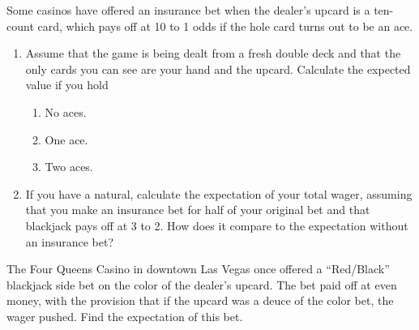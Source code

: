 \documentclass[12pt,letterpaper]{hmcpset}
\begin{document}
\begin{problem}[Bollman 6.2]
  Some casinos have offered an insurance bet when the dealer’s upcard is a ten-count card, which pays off at 10 to 1 odds if the hole card turns out to be an ace.
  \begin{enumerate}[label=(\alph*)]
  \item Assume that the game is being dealt from a fresh double deck and that the only cards you can see are your hand and the upcard. Calculate the expected value if you hold
    \begin{enumerate}[label=\roman*.]
    \item No aces.
    \item One ace.
    \item Two aces.
    \end{enumerate}
  \item If you have a natural, calculate the expectation of your total wager, assuming that you make an insurance bet for half of your original bet and that blackjack pays off at 3 to 2.
    How does it compare to the expectation without an insurance bet?
  \end{enumerate}
\end{problem}
\begin{solution}

\end{solution}
\pagebreak
\begin{problem}[Bollman 6.4]
  The Four Queens Casino in downtown Las Vegas once offered a “Red/Black” blackjack side bet on the color of the dealer’s upcard.
  The bet paid off at even money, with the provision that if the upcard was a deuce of the color bet, the wager pushed.
  Find the expectation of this bet.
\end{problem}
\begin{solution}

\end{solution}
\pagebreak
\end{document}

